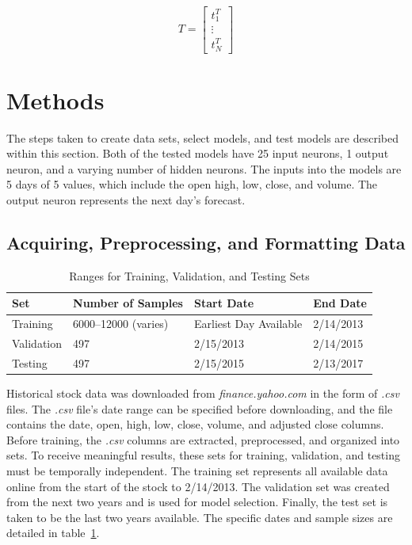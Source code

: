 \documentclass{ncjms}
\begin{document}
	\begin{equation}
		T =
		\begin{bmatrix}
			t_{1}^T \\
			\vdots \\
			t_{N}^T
		\end{bmatrix}
	\end{equation}

	\section{Methods}\label{sec:methods}
	The steps taken to create data sets, select models, and test models are described within this section.
	Both of the tested models have 25 input neurons, 1 output neuron, and a varying number of hidden neurons.
	The inputs into the models are 5 days of 5 values, which include the open high, low, close, and volume.
	The output neuron represents the next day's forecast.

	\subsection{Acquiring, Preprocessing, and Formatting Data}\label{subsec:acquiring-preprocessing-and-formatting-data}

	\begin{table}[!htbp]
	\caption{Ranges for Training, Validation, and Testing Sets}
	\label{tab:samples_dates}
		\begin{tabular}{llll}\toprule
		Set        & Number of Samples     & Start Date             & End Date  \\\midrule
		Training   & 6000--12000 (varies)  & Earliest Day Available & 2/14/2013 \\
		Validation & 497                   & 2/15/2013              & 2/14/2015 \\
		Testing    & 497                   & 2/15/2015              & 2/13/2017 \\\bottomrule
		\end{tabular}
	\end{table}

	Historical stock data was downloaded from \textit{finance.yahoo.com} in the form of \textit{.csv} files.
	The \textit{.csv} file's date range can be specified before downloading, and the file contains the date, open, high, low, close, volume, and adjusted close columns.
	Before training, the \textit{.csv} columns are extracted, preprocessed, and organized into sets.
	To receive meaningful results, these sets for training, validation, and testing must be temporally independent.
	The training set represents all available data online from the start of the stock to 2/14/2013.
	The validation set was created from the next two years and is used for model selection.
	Finally, the test set is taken to be the last two years available.
	The specific dates and sample sizes are detailed in table~\ref{tab:samples_dates}.
\end{document}
